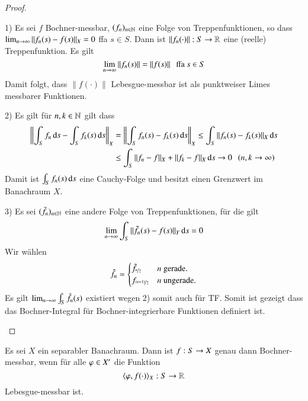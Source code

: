 \begin{proof}
    \begin{description}
        \item{1)}
        Es sei $f$ Bochner-messbar, $(f_n)_{n\in \mathbb{N}}$ eine Folge von Treppenfunktionen, so dass
        $\lim_{n\rightarrow \infty}\|f_n(s)-f(s)\|_X=0$ ffa $s\in S$. Dann ist $\|f_n(\cdot)\|:S\rightarrow \mathbb{R}$ eine
        (reelle) Treppenfunktion. Es gilt
        \[
            \lim_{n\rightarrow\infty} \|f_n(s)\| =\|f(s)\| \hspace{.25cm} \text{ffa } s\in S 
        \]
        Damit folgt, dass $\|f(\cdot)\|$ Lebesgue-messbar ist als punktweiser Limes messbarer Funktionen.
        \item{2)}
        Es gilt für $n,k\in\mathbb{N}$ gilt dass
        \begin{align*}
            \left\|\int_Sf_n\, \mathrm{d} s - \int_Sf_k(s)\, \mathrm{d} s\right\|_X &=\left\| \int_S f_n(s)-f_k(s)\, \mathrm{d} s
                \right\| _X\leq \int_S\|f_n (s)- f_k(s)\|_X\, \mathrm{d} s\\ 
            &\leq \int_S\|f_n-f\|_X + \|f_k-f\|_X \, \mathrm{d} s \rightarrow 0 \hspace{.25cm} (n,k\rightarrow \infty)
        \end{align*}
        Damit ist $\int_S f_n(s)\, \mathrm{d} s$ eine Cauchy-Folge und besitzt einen Grenzwert im Banachraum $X$.
        \item{3)}
        Es sei $(\tilde f _n)_{n\in\mathbb{N}}$ eine andere Folge von Treppenfunktionen, für die gilt
        \[
            \lim_{n\rightarrow \infty} \int_S\|\tilde f_n(s)-f(s)\|_Y \, \mathrm{d} s=0
        \]
        Wir wählen
        \[
            \hat f_n= \begin{cases} \tilde f_{\nicefrac n2} & \text{$n$ gerade.}\\
                      f_{\nicefrac{(n+1)}{2}} & \text{$n$ ungerade.} \end{cases}
        \]
        Es gilt $\lim_{n\rightarrow \infty}\int_S \hat f_n(s)$ existiert wegen 2) somit auch für TF. Somit ist
        gezeigt dass das Bochner-Integral für Bochner-integrierbare Funktionen definiert ist.

    \end{description}
    \[ \]
\end{proof}

\begin{theorem}[Pettis]\label{4.24}
    Es sei $X$ ein separabler Banachraum. Dann ist $f:S\rightarrow X$ genau dann Bochner-messbar, wenn für alle
    $\varphi \in X'$ die Funktion
    \[
        \langle \varphi,f(\cdot)\rangle_X:S\rightarrow \mathbb{R}
    \]
    Lebesgue-messbar ist.
\end{theorem}

